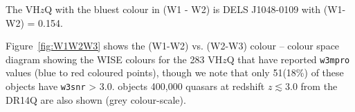 \documentclass[usenatbib]{mnras}
\begin{document}
The VH$z$Q with the bluest colour in (W1 - W2) is 
DELS J1048-0109 with (W1-W2) = 0.154. 

Figure~\ref{fig:W1W2W3} shows the (W1-W2) vs. (W2-W3) colour – colour space diagram showing the WISE colours for the 283 VH$z$Q that have reported {\tt w3mpro} values (blue to red coloured points), though we note that only 51(18\%) of these objects have {\tt w3snr} > 3.0.  objects  400,000 quasars
at redshift $z\lesssim3.0$ from the DR14Q are also shown (grey
colour-scale). 


\end{document}
